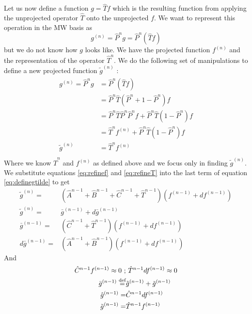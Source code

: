 \documentclass[../master_thesis.tex]{subfiles}
\begin{document}
Let us now define a function $g = \hat{T}f$ which is the resulting function from applying the
unprojected operator $\hat{T}$ onto the unprojected $f$. We want to represent this
operation in the \ac{MW} basis as
\begin{equation}
  g^{(n)} = \hat{P}^ng =  \hat{P}^n\left(\hat{T}f\right)
\end{equation}
but we do not know how $g$ looks like. We have the projected function $f^{ (n)}$ and the
representation of the operator $\hat{T}^n$. We do the following set of manipulations to
define a new projected function $\tilde{g}^{(n)}$ \cite{Frediani:2013}:
\begin{align}
  \begin{split}\label{eq:definegtilde}
    g^{(n)} = \hat{P}^ng &=  \hat{P}^n\left(\hat{T}f\right)\\
     &= \hat{P}^n\hat{T}\left(\hat{P}^n + 1 - \hat{P}^n\right)f\\
     &= \hat{P}^n\hat{T}\hat{P}^n\hat{P}^nf + \hat{P}^n\hat{T}\left(1 - \hat{P}^n\right)f\\
     &=   \hat{T}^nf^{(n)} + \hat{P}^n\hat{T}\left(1 - \hat{P}^n\right)f\\
    \tilde{g}^{(n)} &= \hat{T}^nf^{(n)}\\
  \end{split}
\end{align}
Where we know $ \hat{T}^n$ and $f^{(n)}$ as defined above and we focus only in
finding $\tilde{g}^{(n)}$. We substitute equations \ref{eq:refinef} and \ref{eq:refineT}
into the last term of equation \ref{eq:definegtilde} to get
\begin{align}
  \tilde{g}^{(n)} =& \left(\hat{A}^{n-1} + \hat{B}^{n-1} + \hat{C}^{n-1} + \hat{T}^{n-1}\right)\left(f^{(n-1)} + df^{(n-1)}\right)\\
  \tilde{g}^{(n)} =&  \bar{g}^{(n-1)} + d\bar{g}^{(n-1)}\\
  \bar{g}^{(n-1)} =&\left(\hat{C}^{n-1} + \hat{T}^{n-1}\right)\left(f^{(n-1)} + df^{(n-1)}\right)\\
  d\bar{g}^{(n-1)} =& \left(\hat{A}^{n-1} + \hat{B}^{n-1}\right)\left(f^{(n-1)} + df^{(n-1)}\right)
\end{align}
And
\begin{align}
  \begin{split}
    \hat{C}^{n-1}f^{(n-1)} \approx 0 \ ;& \ \hat{T}^{n-1}df^{(n-1)}\approx 0\\
    \bar{g}^{(n-1)} \defeq& \hat{g}^{(n-1)} + \tilde{g}^{(n-1)}\\
    \hat{g}^{(n-1)} =& \hat{C}^{n-1}df^{(n-1)}\\
    \tilde{g}^{(n-1)} =& \hat{T}^{n-1}f^{(n-1)}
  \end{split}
\end{align}
\end{document}
